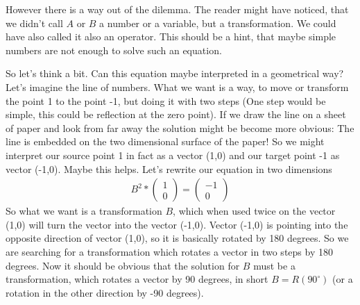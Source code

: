 However there is a way out of the dilemma. The reader might have
noticed, that we didn't call $A$ or $B$ a number or a variable, but
a transformation. We could have also called it also an operator. This
should be a hint, that maybe simple numbers are not enough to solve such
an equation.

So let's think a bit. Can this equation maybe interpreted in a
geometrical way? Let's imagine the line of numbers. What we want is a
way, to move or transform the point 1 to the point -1, but doing it with
two steps (One step would be simple, this could be reflection at the
zero point). If we draw the line on a sheet of paper and look from far
away the solution might be become more obvious: The line is embedded on
the two dimensional surface of the paper! So we might interpret our
source point 1 in fact as a vector (1,0) and our target point -1 as
vector (-1,0). Maybe this helps. Let's rewrite our equation in two
dimensions 
\begin{align}
B^2 * \begin{pmatrix} 1 \\ 0 \end{pmatrix} = \begin{pmatrix} -1 \\ 0 \end{pmatrix} 
\end{align} 
So what we want is a transformation $B$, which when used twice on
the vector (1,0) will turn the vector into the vector (-1,0). Vector
(-1,0) is pointing into the opposite direction of vector (1,0), so it is
basically rotated by 180 degrees. So we are searching for a
transformation which rotates a vector in two steps by 180 degrees. Now
it should be obvious that the solution for $B$ must be a
transformation, which rotates a vector by 90 degrees, in short
$B = R(90^{\circ})$ (or a rotation in the other direction by -90
degrees).


